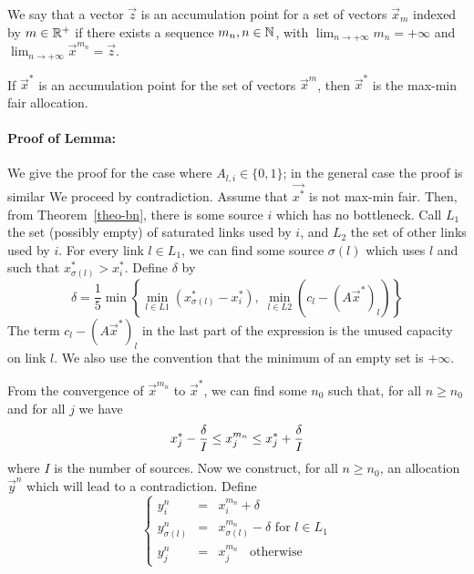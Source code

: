 \begin{definition}
We say that a vector $\vec{z}$ is an accumulation point for a set
of vectors $\vec{x}_m$ indexed by $m\in \Bbb{R}^+$ if there exists
a sequence $m_n, n\in \Bbb{N}$, with $\lim_{n \rightarrow + \infty}
m_n = + \infty$ and $\lim_{n \rightarrow + \infty} \vec{x}^{m_n} =
\vec{z}$.
\end{definition}

\begin{lemma}
If $\vec{x}^*$ is an accumulation point for the set of vectors
$\vec{x}^{m}$, then $\vec{x}^*$ is the max-min fair allocation.
\end{lemma}
\paragraph{Proof of Lemma: }
We give the proof for the case where $A_{l,i} \in \{0, 1\}$; in
the general case the proof is similar We proceed by contradiction.
Assume that $\vec{x^*}$ is not max-min fair. Then, from
Theorem~\ref{theo-bn}, there is some source $i$ which has no
bottleneck. Call $L_1$ the set (possibly empty) of saturated links
used by $i$, and $L_2$ the set of other links used by $i$. For
every link $l \in L_1$, we can find some source $\sigma(l)$ which
uses $l$ and such that $x^*_{\sigma(l)} > x^*_i$. Define $\delta$
by
 $$ \delta = \frac{1}{5} \min \left\{
 \min_{l \in L1} ( x^*_{\sigma(l)} - x^*_i), \;
 \min_{l \in L2} ( c_l -(A\vec{x}^*)_{l})
 \right\}
 $$
The term $c_l - (A\vec{x}^*)_{l}$ in the last part of the
expression is the unused capacity on link $l$. We also use the
convention that the minimum of an empty set is $+ \infty$.


From the convergence of $\vec{x}^{m_n}$ to $\vec{x}^*$, we can
find some $n_0$ such that, for all $n \geq n_0$ and for all $j$ we
have
\begin{equation}\mylabel{eq-defdesx}
   x^*_j - \frac{\delta}{I} \leq x^{m_n}_j \leq  x^*_j + \frac{\delta}{I}
\end{equation}
where $I$ is the number of sources. Now we construct, for all $n
\geq n_0$, an allocation $\vec{y}^n$ which will lead to a
contradiction. Define
 $$
  \left\{
  \begin{array}{rcl}
   y^n_i &=& x^{m_n}_i + \delta \\
   y^n_{\sigma(l)} &=&x^{m_n}_{\sigma(l)} - \delta \mbox{ for } l \in L_1\\
   y^n_j&=&x^{m_n}_j  \; \; \mbox{ otherwise}
  \end{array}
  \right.
 $$


